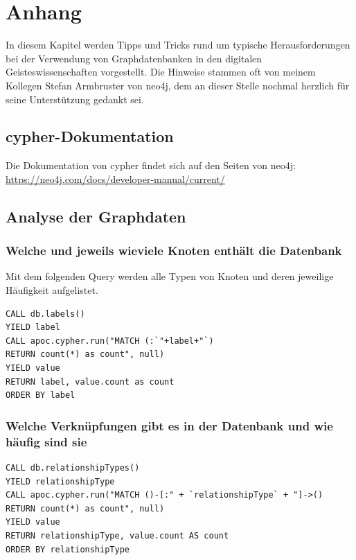\documentclass[ngerman,]{scrreprt}
\begin{document}
\chapter{Anhang}\label{anhang}

In diesem Kapitel werden Tipps und Tricks rund um typische Herausforderungen bei der Verwendung von Graphdatenbanken in den digitalen Geisteswissenschaften vorgestellt. Die Hinweise stammen oft von meinem Kollegen Stefan Armbruster von neo4j, dem an dieser Stelle nochmal herzlich für seine Unterstützung gedankt sei.

\section{cypher-Dokumentation}\label{cypher-dokumentation}

Die Dokumentation von cypher findet sich auf den Seiten von neo4j: \url{https://neo4j.com/docs/developer-manual/current/}

\section{Analyse der Graphdaten}\label{analyse-der-graphdaten}

\subsection{Welche und jeweils wieviele Knoten enthält die Datenbank}\label{welche-und-jeweils-wieviele-knoten-enthuxe4lt-die-datenbank}

Mit dem folgenden Query werden alle Typen von Knoten und deren jeweilige Häufigkeit aufgelistet.

\begin{verbatim}
CALL db.labels()
YIELD label
CALL apoc.cypher.run("MATCH (:`"+label+"`)
RETURN count(*) as count", null)
YIELD value
RETURN label, value.count as count
ORDER BY label
\end{verbatim}

\subsection{Welche Verknüpfungen gibt es in der Datenbank und wie häufig sind sie}\label{welche-verknuxfcpfungen-gibt-es-in-der-datenbank-und-wie-huxe4ufig-sind-sie}

\begin{verbatim}
CALL db.relationshipTypes()
YIELD relationshipType
CALL apoc.cypher.run("MATCH ()-[:" + `relationshipType` + "]->()
RETURN count(*) as count", null)
YIELD value
RETURN relationshipType, value.count AS count
ORDER BY relationshipType
\end{verbatim}
\end{document}
